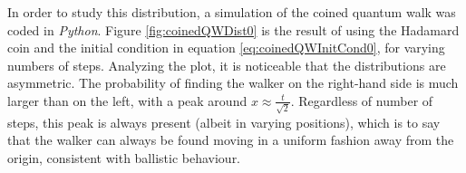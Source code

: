 \documentclass[../../dissertation.tex]{subfiles}
\begin{document}
In order to study this distribution, a simulation of the coined quantum walk
was coded in \textit{Python}. Figure \ref{fig:coinedQWDist0} is the result of
using the Hadamard coin and the initial condition in equation
\ref{eq:coinedQWInitCond0}, for varying numbers of steps. Analyzing the plot,
it is noticeable that the distributions are asymmetric. The probability of
finding the walker on the right-hand side is much larger than on the left, with
a peak around $x \approx \frac{t}{\sqrt{2}}$. Regardless of number of steps,
this peak is always present (albeit in varying positions), which is to say that
the walker can always be found moving in a uniform fashion away from the
origin, consistent with ballistic behaviour.\par 
\end{document}
